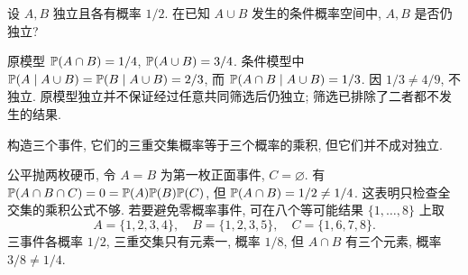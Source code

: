 \begin{exercise}
设 $A,B$ 独立且各有概率 $1/2$. 在已知 $A\cup B$ 发生的条件概率空间中, $A,B$ 是否仍独立?
\end{exercise}
\begin{solution}
原模型 $\mathbb P(A\cap B)=1/4$, $\mathbb P(A\cup B)=3/4$. 条件模型中 $\mathbb P(A\mid A\cup B)=\mathbb P(B\mid A\cup B)=2/3$, 而 $\mathbb P(A\cap B\mid A\cup B)=1/3$. 因 $1/3\ne4/9$, 不独立. 原模型独立并不保证经过任意共同筛选后仍独立; 筛选已排除了二者都不发生的结果.
\end{solution}

\begin{exercise}
构造三个事件, 它们的三重交集概率等于三个概率的乘积, 但它们并不成对独立.
\end{exercise}
\begin{solution}
公平抛两枚硬币, 令 $A=B$ 为第一枚正面事件, $C=\varnothing$. 有 $\mathbb P(A\cap B\cap C)=0=\mathbb P(A)\mathbb P(B)\mathbb P(C)$, 但 $\mathbb P(A\cap B)=1/2\ne1/4$. 这表明只检查全交集的乘积公式不够. 若要避免零概率事件, 可在八个等可能结果 $\{1,\ldots,8\}$ 上取
\[
 A=\{1,2,3,4\},\quad B=\{1,2,3,5\},\quad C=\{1,6,7,8\}.
\]
三事件各概率 $1/2$, 三重交集只有元素一, 概率 $1/8$, 但 $A\cap B$ 有三个元素, 概率 $3/8\ne1/4$.
\end{solution}
